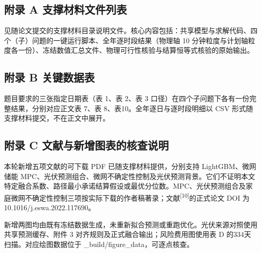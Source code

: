 \documentclass[12pt,a4paper]{ctexart}
\begin{document}
\subsection*{附录 A 支撑材料文件列表}

见随论文提交的支撑材料目录说明文件。核心内容包括：共享模型与求解代码、四个（子）问题的一键运行脚本、全年逐时段结果（物理轴 10 分钟粒度与计划轴粒度各一份）、冻结数值汇总文件、物理可行性核验与结算恒等式核验的原始输出。

\subsection*{附录 B 关键数据表}

题目要求的三张指定日期表（表 1、表 2、表 3 口径）在四个子问题下各有一份完整结果，分别对应正文表 7、表 8、表10。全年逐日与逐时段明细以 CSV 形式随支撑材料提交，不在正文中展开。

\subsection*{附录 C 文献与新增图表的核查说明}

本轮新增五项文献的可下载 PDF 已随支撑材料提供，分别支持 LightGBM、微网储能 MPC、光伏预测组合、微网不确定性控制及光伏预测背景。它们不证明本文特定融合系数、路径最小承诺结算假设或最优分位数。MPC、光伏预测组合及家庭微网不确定性控制三项按实际下载的作者稿著录；文献\textsuperscript{[10]}的正式论文 DOI 为 10.1016/j.eswa.2022.117690。

新增两图均由既有冻结数据生成，未重新拟合预测或重跑优化。光伏来源对照使用共享预测缓存、附件 3 对齐规则及正式融合输出；风险费用图使用表 D 的334天扫描。对应绘图数据位于 \_build/figure\_data，可逐点核查。
\end{document}
